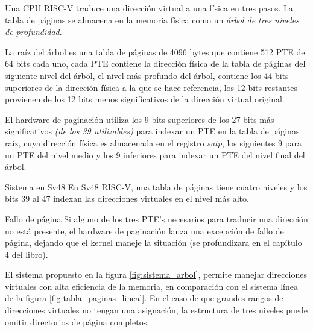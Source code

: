 \documentclass{libs/ufc_format}
\begin{document}
\begin{frame}{}
  Una CPU RISC-V traduce una dirección virtual a una física en tres pasos. La tabla de páginas se almacena en la memoria física como un \emph{árbol de tres niveles de profundidad}.

  \vspace{0.2cm}

  La raíz del árbol es una tabla de páginas de 4096 bytes que contiene 512 PTE de 64 bits cada uno, cada PTE contiene la dirección física de la tabla de páginas del siguiente nivel del árbol, el nivel más profundo del árbol, contiene los 44 bits superiores de la dirección física a la que se hace referencia, los 12 bits restantes provienen de los 12 bits menos significativos de la dirección virtual original. \cite{xv6_book}
\end{frame}
\begin{frame}{}
  El hardware de paginación utiliza los 9 bits superiores de los 27 bits más significativos \emph{(de los 39 utilizables)} para indexar un PTE en la tabla de páginas raíz, cuya dirección física es almacenada en el registro \emph{satp}, los siguientes 9 para un PTE del nivel medio y los 9 inferiores para indexar un PTE del nivel final del árbol. \cite{xv6_book}

  \vspace{0.4cm}

  \begin{block}{Sistema en Sv48}
    En Sv48 RISC-V, una tabla de páginas tiene cuatro niveles y los bits 39 al 47 indexan las direcciones virtuales en el nivel más alto. \cite{xv6_book}
  \end{block}
\end{frame}
\begin{frame}{Fallo de página}
  Si alguno de los tres PTE's necesarios para traducir una dirección no está presente, el hardware de paginación lanza una excepción de fallo de página, dejando que el kernel maneje la situación (se profundizara en el capítulo 4 del libro). \cite{xv6_book}

  \vspace{0.3cm}

  El sistema propuesto en la figura \ref{fig:sistema_arbol}, permite manejar direcciones virtuales con alta eficiencia de la memoria, en comparación con el sistema línea de la figura \ref{fig:tabla_paginas_lineal}. En el caso de que grandes rangos de direcciones virtuales no tengan una asignación, la estructura de tres niveles puede omitir directorios de página completos.
\end{frame}
\end{document}
